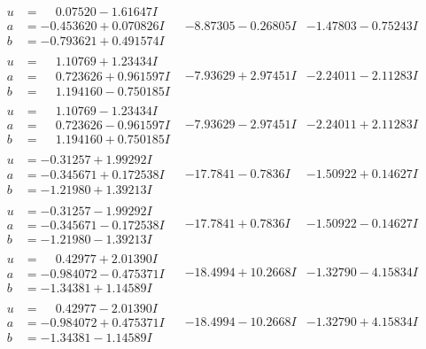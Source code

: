 \documentclass[1p]{elsarticle_modified}
\theoremstyle{definition}
\begin{document}
$$\begin{array}{c|c|c}
\begin{aligned}
u &= \phantom{-}0.07520 - 1.61647 I \\
a &= -0.453620 + 0.070826 I \\
b &= -0.793621 + 0.491574 I\end{aligned}
 & -8.87305 - 0.26805 I & -1.47803 - 0.75243 I \\ \hline\begin{aligned}
u &= \phantom{-}1.10769 + 1.23434 I \\
a &= \phantom{-}0.723626 + 0.961597 I \\
b &= \phantom{-}1.194160 - 0.750185 I\end{aligned}
 & -7.93629 + 2.97451 I & -2.24011 - 2.11283 I \\ \hline\begin{aligned}
u &= \phantom{-}1.10769 - 1.23434 I \\
a &= \phantom{-}0.723626 - 0.961597 I \\
b &= \phantom{-}1.194160 + 0.750185 I\end{aligned}
 & -7.93629 - 2.97451 I & -2.24011 + 2.11283 I \\ \hline\begin{aligned}
u &= -0.31257 + 1.99292 I \\
a &= -0.345671 + 0.172538 I \\
b &= -1.21980 + 1.39213 I\end{aligned}
 & -17.7841 - 0.7836 I & -1.50922 + 0.14627 I \\ \hline\begin{aligned}
u &= -0.31257 - 1.99292 I \\
a &= -0.345671 - 0.172538 I \\
b &= -1.21980 - 1.39213 I\end{aligned}
 & -17.7841 + 0.7836 I & -1.50922 - 0.14627 I \\ \hline\begin{aligned}
u &= \phantom{-}0.42977 + 2.01390 I \\
a &= -0.984072 - 0.475371 I \\
b &= -1.34381 + 1.14589 I\end{aligned}
 & -18.4994 + 10.2668 I & -1.32790 - 4.15834 I \\ \hline\begin{aligned}
u &= \phantom{-}0.42977 - 2.01390 I \\
a &= -0.984072 + 0.475371 I \\
b &= -1.34381 - 1.14589 I\end{aligned}
 & -18.4994 - 10.2668 I & -1.32790 + 4.15834 I \\ \hline\begin{aligned}

\end{aligned}
\end{array}$$
\end{document}
